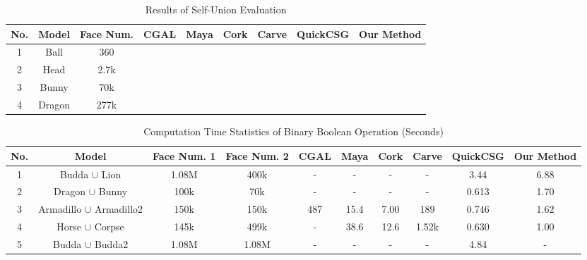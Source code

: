 \documentclass[10pt,journal,compsoc]{IEEEtran}
\newcommand{\cmark}{\ding{51}}%
\newcommand{\xmark}{\ding{55}}%
\begin{document}
\begin{table}[ht]
\caption{Results of Self-Union Evaluation}
\label{tab:selfunion}
\centering
\begin{tabular}{*{8}{c|}c}%
\hline
{No.} & {Model} & {Face Num.} &
CGAL & Maya & Cork & Carve & QuickCSG  & Our Method
\\
\hline\hline
1 & Ball & 360  & \cmark & \cmark & \xmark & \cmark & \xmark & \cmark \\
2 & Head & 2.7k& \cmark & \cmark & \xmark & \cmark & \xmark  & \cmark\\
3 & Bunny & 70k  & \xmark & \cmark & \xmark & \cmark & \xmark  & \cmark\\
4 & Dragon & 277k & \xmark & \xmark & \xmark & \xmark & \xmark  & \cmark \\
\hline
\end{tabular}
\begin{flushleft}
\end{flushleft}
\end{table}

\begin{table}[ht]
\caption{Computation Time Statistics of Binary Boolean Operation (Seconds)}
\label{tab:performance}
\centering
\begin{tabular}{*{9}{c|}c}%
\hline
{No.} & {Model} & {Face Num. 1} & {Face Num. 2} &
CGAL & Maya & Cork & Carve & QuickCSG & Our Method
\\
\hline\hline
1 & Budda $\cup$ Lion & 1.08M & 400k & - & - & - & - & 3.44 & 6.88\\
2 & Dragon $\cup$ Bunny & 100k & 70k & - & - & - & - & 0.613 &1.70 \\
3 & Armadillo $\cup$ Armadillo2 & 150k & 150k & 487 & 15.4 & 7.00 & 189 & 0.746 & 1.62\\
4 & Horse $\cup$ Corpse & 145k & 499k & - & 38.6 & 12.6 & 1.52k & 0.630 & 1.00 \\
5 & Budda $\cup$ Budda2 & 1.08M & 1.08M & - & - & - & - & 4.84 & -\\
\hline
\end{tabular}
\begin{flushleft}

\end{flushleft}
\end{table}
\end{document}

